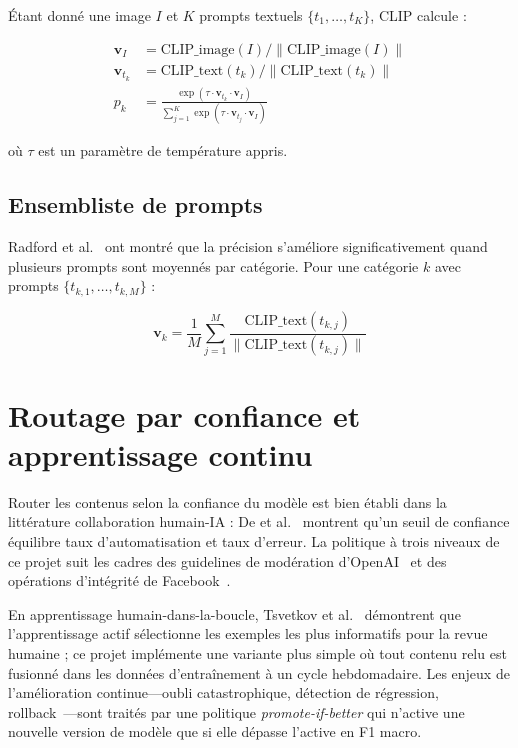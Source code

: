 Étant donné une image $I$ et $K$ prompts textuels $\{t_1, \ldots, t_K\}$, CLIP calcule :

\begin{align}
\mathbf{v}_I &= \text{CLIP\_image}(I) / \|\text{CLIP\_image}(I)\| \nonumber\\
\mathbf{v}_{t_k} &= \text{CLIP\_text}(t_k) / \|\text{CLIP\_text}(t_k)\| \nonumber\\
p_k &= \frac{\exp(\tau \cdot \mathbf{v}_{t_k} \cdot \mathbf{v}_I)}{\sum_{j=1}^{K} \exp(\tau \cdot \mathbf{v}_{t_j} \cdot \mathbf{v}_I)}
\label{eq:clip_zeroshot}
\end{align}

où $\tau$ est un paramètre de température appris.

\subsection{Ensembliste de prompts}

Radford et al.~\cite{radford2021learning} ont montré que la précision s'améliore significativement quand plusieurs prompts sont moyennés par catégorie. Pour une catégorie $k$ avec prompts $\{t_{k,1}, \ldots, t_{k,M}\}$ :

\begin{equation}
\mathbf{v}_{k} = \frac{1}{M} \sum_{j=1}^{M} \frac{\text{CLIP\_text}(t_{k,j})}{\|\text{CLIP\_text}(t_{k,j})\|}
\label{eq:prompt_ensemble}
\end{equation}

\section{Routage par confiance et apprentissage continu}

Router les contenus selon la confiance du modèle est bien établi dans la littérature collaboration humain-IA : De et al.~\cite{de2020learning} montrent qu'un seuil de confiance équilibre taux d'automatisation et taux d'erreur. La politique à trois niveaux de ce projet suit les cadres des guidelines de modération d'OpenAI~\cite{openai2023moderation} et des opérations d'intégrité de Facebook~\cite{facebook2020integrity}.

En apprentissage humain-dans-la-boucle, Tsvetkov et al.~\cite{tsvetkov2022active} démontrent que l'apprentissage actif sélectionne les exemples les plus informatifs pour la revue humaine ; ce projet implémente une variante plus simple où tout contenu relu est fusionné dans les données d'entraînement à un cycle hebdomadaire. Les enjeux de l'amélioration continue---oubli catastrophique, détection de régression, rollback~\cite{polyzotis2019managing}---sont traités par une politique \emph{promote-if-better} qui n'active une nouvelle version de modèle que si elle dépasse l'active en F1 macro.

